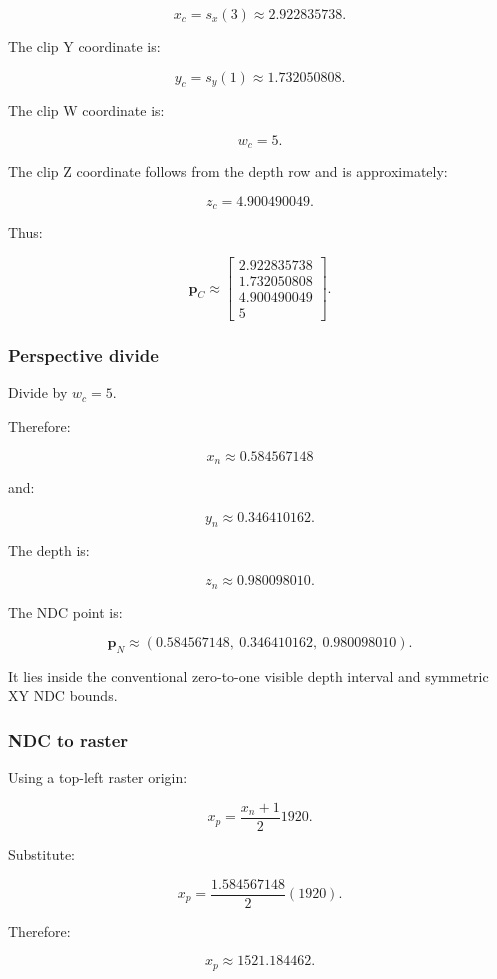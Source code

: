 \[
 x_c=s_x(3)\approx2.922835738.
\]

The clip Y coordinate is:

\[
 y_c=s_y(1)\approx1.732050808.
\]

The clip W coordinate is:

\[
 \boxed{w_c=5}.
\]

The clip Z coordinate follows from the depth row and is approximately:

\[
 z_c=4.900490049.
\]

Thus:

\[
 \boxed{ \mathbf p_C\approx \begin{bmatrix} 2.922835738\\ 1.732050808\\ 4.900490049\\ 5 \end{bmatrix} }.
\]

\subsubsection{Perspective divide}\label{02-foundations-ii-ch037-perspective-divide}

Divide by \(w_c=5\).

Therefore:

\[
 \boxed{ x_n\approx0.584567148 }
\]

and:

\[
 \boxed{ y_n\approx0.346410162 }.
\]

The depth is:

\[
 \boxed{ z_n\approx0.980098010 }.
\]

The NDC point is:

\[
 \boxed{ \mathbf p_N\approx (0.584567148,\ 0.346410162,\ 0.980098010) }.
\]

It lies inside the conventional zero-to-one visible depth interval and symmetric XY NDC bounds.

\subsubsection{NDC to raster}\label{02-foundations-ii-ch037-ndc-to-raster}

Using a top-left raster origin:

\[
 x_p=\frac{x_n+1}{2}1920.
\]

Substitute:

\[
 x_p= \frac{1.584567148}{2}(1920).
\]

Therefore:

\[
 \boxed{x_p\approx1521.184462}.
\]

